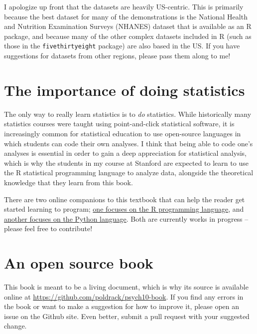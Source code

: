 \documentclass[12pt,]{book}
\theoremstyle{definition}
\theoremstyle{definition}
\theoremstyle{definition}
\theoremstyle{remark}
\begin{document}
I apologize up front that the datasets are heavily US-centric. This is primarily because the best dataset for many of the demonstrations is the National Health and Nutrition Examination Surveys (NHANES) dataset that is available as an R package, and because many of the other complex datasets included in R (such as those in the \texttt{fivethirtyeight} package) are also based in the US. If you have suggestions for datasets from other regions, please pass them along to me!

\hypertarget{the-importance-of-doing-statistics}{%
\section{The importance of doing statistics}\label{the-importance-of-doing-statistics}}

The only way to really learn statistics is to \emph{do} statistics. While historically many statistics courses were taught using point-and-click statistical software, it is increasingly common for statistical education to use open-source languages in which students can code their own analyses. I think that being able to code one's analyses is essential in order to gain a deep appreciation for statistical analysis, which is why the students in my course at Stanford are expected to learn to use the R statistical programming language to analyze data, alongside the theoretical knowledge that they learn from this book.

There are two online companions to this textbook that can help the reader get started learning to program; \href{https://statsthinking21.github.io/statsthinking21-R-site/}{one focuses on the R programming language}, and \href{https://statsthinking21.github.io/statsthinking21-python/}{another focuses on the Python language}. Both are currently works in progress -- please feel free to contribute!

\hypertarget{an-open-source-book}{%
\section{An open source book}\label{an-open-source-book}}

This book is meant to be a living document, which is why its source is available online at \url{https://github.com/poldrack/psych10-book}. If you find any errors in the book or want to make a suggestion for how to improve it, please open an issue on the Github site. Even better, submit a pull request with your suggested change.
\end{document}
